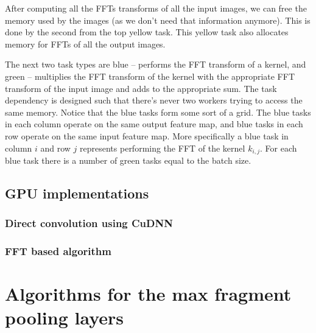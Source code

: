 \documentclass[conference]{IEEEtran}
\begin{document}
After computing all the FFTs transforms of all the input images, we
can free the memory used by the images (as we don't need that
information anymore).  This is done by the second from the top yellow
task.  This yellow task also allocates memory for FFTs of all the
output images.

The next two task types are blue -- performs the FFT transform of a
kernel, and green -- multiplies the FFT transform of the kernel with
the appropriate FFT transform of the input image and adds to the
appropriate sum.  The task dependency is designed such that there's
never two workers trying to access the same memory.  Notice that the
blue tasks form some sort of a grid.  The blue tasks in each column
operate on the same output feature map, and blue tasks in each row
operate on the same input feature map.  More specifically a blue task
in column $i$ and row $j$ represents performing the FFT of the kernel
$k_{i,j}$.  For each blue task there is a number of green tasks equal
to the batch size.

\subsection{GPU implementations}

\subsubsection{Direct convolution using CuDNN}

\subsubsection{FFT based algorithm}



%


\section{Algorithms for the max fragment pooling layers}
\end{document}
